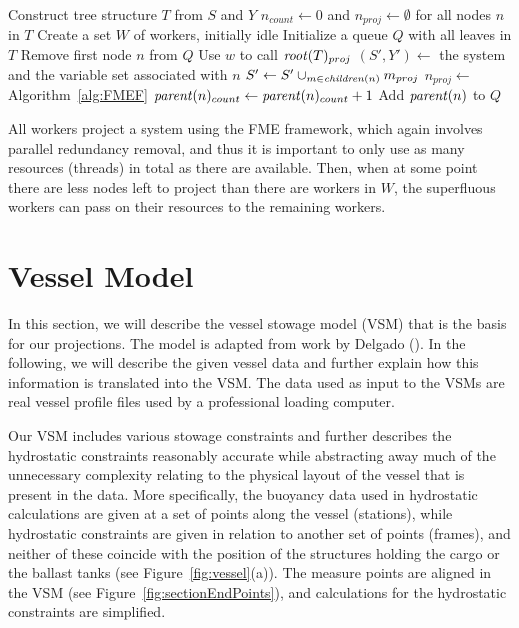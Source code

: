 \begin{algorithmic}
	\State Construct  tree structure $T$ from $S$ and $Y$
	\State $n_{count}\gets 0$ and $n_{proj}\gets\emptyset$ for all nodes $n$ in $T$
	\State Create a set $W$ of workers, initially idle
	\State Initialize a queue $Q$ with all leaves in $T$
			\State Remove first node $n$ from $Q$
			\State Use $w$ to call 
		\EndIf
	\EndWhile
	\State \Return $\mathit{root}(T)_{proj}$
\EndFunction
\Statex
{}
	\State $(S',Y')\gets$ the system and the variable set associated with $n$
	\State $S'\gets S'\cup_{m\in \mathit{children}(n)} m_{proj}$ 
	\State $n_{proj}\gets$  \Comment Algorithm~\ref{alg:FMEF}
	\State $\mathit{parent}(n)_{count} \gets \mathit{parent}(n)_{count} +1$
		\State Add $\mathit{parent}(n)$ to $Q$
	\EndIf
	\State \Return
\EndFunction
\end{algorithmic}	

\vspace{1mm}
All workers project a system using the FME framework, which again involves parallel redundancy removal, and thus it is important to only use as many resources (threads) in total as there are available.
Then, when at some point there are less nodes left to project than there are workers in $W$, the superfluous workers can pass on their resources to the remaining workers.  

\section{Vessel Model}\label{sec:VMs}
In this section, we will describe the vessel stowage model (VSM) that is the basis for our projections. The model is adapted from work by Delgado (\cite{AlbertosThesis}). In the following, we will describe the given vessel data and further explain how this information is translated into the VSM.
The data used as input to the VSMs are real vessel profile files used by a professional loading computer. 

Our VSM includes various stowage constraints and further {describes the hydrostatic constraints reasonably accurate while}
abstracting away much of the unnecessary complexity relating to the physical layout of the vessel that is present in the data. 
More specifically, the buoyancy data used in hydrostatic calculations are given at a set of points along the vessel (stations), while hydrostatic constraints are given in relation to another set of points (frames), and neither of these coincide with the position of the structures holding the cargo or the ballast tanks (see Figure~\ref{fig:vessel}(a)). The measure points are aligned in the VSM (see Figure~\ref{fig:sectionEndPoints}), and calculations for the hydrostatic constraints are simplified.

